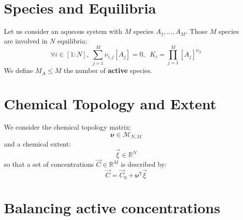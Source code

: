 \documentclass[aps,12pt]{revtex4}
\newcommand{\trn}[1]{{#1}^{\mathtt{T}}}
\newcommand{\conc}[1]{{\left[#1\right]}}
\begin{document}
\section{Species and Equilibria}
Let us consider an aqueous system with $M$ species $A_1,\ldots,A_M$.
Those $M$ species are involved in $N$ equilibria:
\begin{equation}
	\forall i\in[1:N], \; \sum_{j=1}^M \nu_{i,j} \conc{A_j} = 0,
	 \;\; K_i = \prod_{j=1}^M \conc{A_j}^{\nu_{ij}}
\end{equation}
We define $M_A\leq M$ the number of {\bf active} species.

\section{Chemical Topology and Extent}
We consider the chemical topology matrix:
\begin{equation}
	\bm{\nu} \in \mathcal{M}_{N,M}
\end{equation}
and a chemical extent:
\begin{equation}
	\vec{\xi} \in \mathbb{R}^{N}
\end{equation}
so that a set of concentrations $\vec{C}\in\mathbb{R}^M$ is described by:
\begin{equation}
	\vec{C} = \vec{C}_0 + \trn{\bm{\nu}} \vec{\xi}
\end{equation}


\section{Balancing active concentrations}
\end{document}
